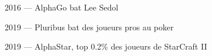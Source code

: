 \begin{frame}{2016 --- AlphaGo bat Lee Sedol}
\end{frame}

\begin{frame}{2019 --- Pluribus bat des joueurs pros au poker}
\end{frame}


\begin{frame}{2019 --- AlphaStar, top 0.2\% des joueurs de StarCraft II}
\end{frame}
